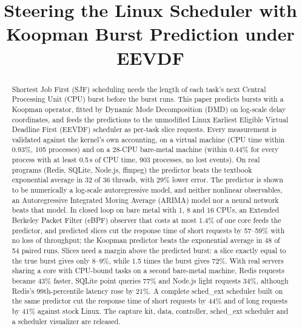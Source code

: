 \documentclass[conference,onecolumn,11pt]{IEEEtran}
\begin{document}

\title{Steering the Linux Scheduler with\\ Koopman Burst Prediction under EEVDF}

\author{
\and
{}
\and
{}
}

\maketitle

\begin{abstract}
Shortest Job First (SJF) scheduling needs the length of each task's next Central Processing Unit (CPU) burst before the burst runs. This paper predicts bursts with a Koopman operator, fitted by Dynamic Mode Decomposition (DMD) on log-scale delay coordinates, and feeds the predictions to the unmodified Linux Earliest Eligible Virtual Deadline First (EEVDF) scheduler as per-task slice requests. Every measurement is validated against the kernel's own accounting, on a virtual machine (CPU time within 0.93\%, 105 processes) and on a 28-CPU bare-metal machine (within 0.44\% for every process with at least 0.5\,s of CPU time, 903 processes, no lost events). On real programs (Redis, SQLite, Node.js, ffmpeg) the predictor beats the textbook exponential average in 32 of 36 threads, with 29\% lower error. The predictor is shown to be numerically a log-scale autoregressive model, and neither nonlinear observables, an Autoregressive Integrated Moving Average (ARIMA) model nor a neural network beats that model. In closed loop on bare metal with 1, 8 and 16 CPUs, an Extended Berkeley Packet Filter (eBPF) observer that costs at most 1.4\% of one core feeds the predictor, and predicted slices cut the response time of short requests by 57--59\% with no loss of throughput; the Koopman predictor beats the exponential average in 48 of 54 paired runs. Slices need a margin above the predicted burst: a slice exactly equal to the true burst gives only 8--9\%, while 1.5 times the burst gives 72\%. With real servers sharing a core with CPU-bound tasks on a second bare-metal machine, Redis requests became 43\% faster, SQLite point queries 77\% and Node.js light requests 34\%, although Redis's 99th-percentile latency rose by 21\%. A complete sched\_ext scheduler built on the same predictor cut the response time of short requests by 44\% and of long requests by 41\% against stock Linux. The capture kit, data, controller, sched\_ext scheduler and a scheduler visualizer are released.
\end{abstract}
\end{document}
